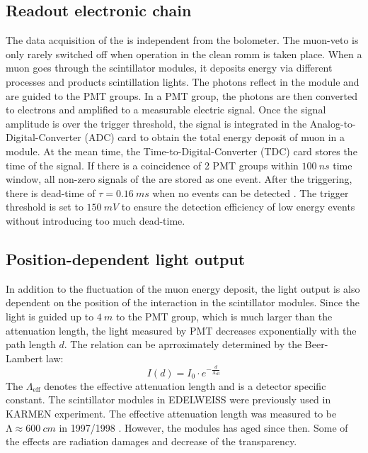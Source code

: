 \subsection{Readout electronic chain}
The data acquisition of the \mvs is independent from the bolometer. The muon-veto is only rarely switched off when operation in the clean romm is taken place.
When a muon goes through the scintillator modules, it deposits energy via different processes and products scintillation lights. The photons reflect in the module and are guided to the PMT groups. In a PMT group, the photons are then converted to electrons and amplified to a measurable electric signal. Once the signal amplitude is over the trigger threshold, the signal is integrated in the Analog-to-Digital-Converter (ADC) card to obtain the total energy deposit of muon in a module. At the mean time, the Time-to-Digital-Converter (TDC) card stores the time of the signal. If there is a coincidence of 2 PMT groups within $\SI{100}{ns}$ time window, all non-zero signals of the \mvs are stored as one event. After the triggering, there is dead-time of $\tau=\SI{0.16}{ms}$ when no events can be detected \cite{Sch13b}. The trigger threshold is set to $\SI{150}{mV}$ to ensure the detection efficiency of low energy events without introducing too much dead-time.

\subsection{Position-dependent light output}
In addition to the fluctuation of the muon energy deposit, the light output is also dependent on the position of the interaction in the scintillator modules. Since the light is guided up to $\SI{4}{m}$ to the PMT group, which is much larger than the attenuation length, the light measured by PMT decreases exponentially with the path length $d$. The relation can be aprroximately determined by the Beer-Lambert law:
\begin{equation}
  I(d)=I_{0}\cdot e^{-\frac{d}{\mathrm{\Lambda}_{\mathrm{eff}}}}
\end{equation}
The $\Lambda_{\mathrm{eff}}$ denotes the effective attenuation length and is a detector specific constant.
The scintillator modules in EDELWEISS were previously used in KARMEN experiment. The effective attenuation length was measured to be $\mathrm{\Lambda} \approx \SI{600}{cm}$ in 1997/1998 \cite{Rei98}. However, the modules has aged since then. Some of the effects are radiation damages and decrease of the transparency.

